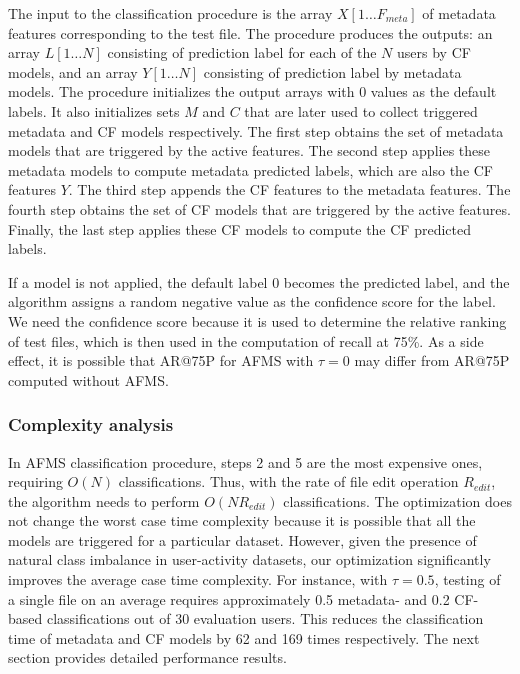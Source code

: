 The input to the classification procedure is the array $X[1 \dots
  F_{meta}]$ of metadata features corresponding to the test 
file.  The procedure produces the outputs: an array $L[1 \dots N]$
consisting of prediction label for each of the $N$ users by CF models, and an array $Y[1 \dots N]$
consisting of prediction label by metadata models.  The
procedure initializes the output arrays with $0$ values as the default labels.  It also
initializes sets $M$ and $C$ that are later used to collect triggered
metadata and CF models respectively.  The first step obtains the set
of metadata models that are triggered by the active features. The
second step applies these metadata models to compute metadata predicted labels, which are also the CF features $Y$.  The third step appends the CF features to the metadata features. 
The fourth step obtains the set of CF models that are triggered by the
active features.  Finally, the last step applies these CF models to
compute the CF predicted labels.

If a model is not applied, the default label $0$ becomes the
predicted label, and the algorithm assigns a random negative value as
the confidence score for the label.  We need the confidence score
because it is used to determine the relative ranking of test files,
which is then used in the computation of recall at 75\%.  As a side
effect, it is possible that AR@75P for AFMS with $\tau = 0$ may differ
from AR@75P computed without AFMS.


\subsubsection{Complexity analysis}  In AFMS classification procedure,
steps 2 and 5 are the most expensive ones, requiring $O(N)$
classifications.  Thus, with the rate of file edit operation
$R_{edit}$, the algorithm needs to perform $O(NR_{edit})$
classifications.  The optimization does not change the worst case time
complexity because it is possible that all the models are triggered
for a particular dataset. However, given the presence of natural
class imbalance in user-activity datasets, our optimization
significantly improves the average case time complexity.  For
instance, with $\tau = 0.5$, testing of a single file on an average
requires approximately 0.5 metadata- and 0.2 CF-based classifications out of 30
evaluation users.  This reduces the classification time of metadata
and CF models by 62 and 169 times respectively. The next section
provides detailed performance results.

